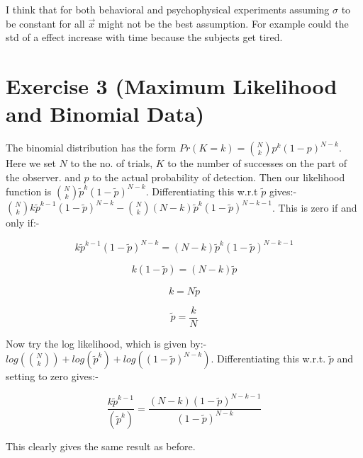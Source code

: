\documentclass[]{article}
\begin{document}
I think that for both behavioral and psychophysical experiments assuming $\sigma$
to be constant for all $\vec{x}$ might not be the best assumption. For example
could the std of a effect increase with time because the subjects get tired. 




\section{Exercise 3 (Maximum Likelihood and Binomial Data)} %
\label{sg:sec:exercise_3_gain_control}

The binomial distribution has the form $Pr(K=k) = {{N} \choose {k}}p^k (1-p)^{N-k}$. Here we set $N$ to the no. of trials, $K$ to the number of successes on the part of the observer.
and $p$ to the actual probability of detection. Then our likelihood function is ${{N} \choose {k}}\tilde{p}^k (1-\tilde{p})^{N-k}$. Differentiating this w.r.t $\tilde{p}$ gives:-
${{N} \choose {k}}k\tilde{p}^{k-1} (1-\tilde{p})^{N-k} - {{N} \choose {k}}(N-k)\tilde{p}^k (1-\tilde{p})^{N-k-1}$. This is zero if and only if:- 

\begin{equation} 
k\tilde{p}^{k-1} (1-\tilde{p})^{N-k} = (N-k)\tilde{p}^k (1-\tilde{p})^{N-k-1}
\end{equation}

\begin{equation}
k (1-\tilde{p}) = (N-k)\tilde{p}
\end{equation}

\begin{equation}
k = N\tilde{p}
\end{equation}

\begin{equation}
\tilde{p} = \frac{k}{N}
\end{equation}

Now try the log likelihood, which is given by:-  $log({{N} \choose {k}})+log(\tilde{p}^k)+log( (1-\tilde{p})^{N-k})$.
Differentiating this w.r.t. $\tilde{p}$ and setting to zero gives:-

\begin{equation}
\frac{k\tilde{p}^{k-1}}{(\tilde{p}^k)}   =   \frac{(N-k)(1-\tilde{p})^{N-k-1}}{ (1-\tilde{p})^{N-k}} 
\end{equation}

This clearly gives the same result as before.



\end{document}
